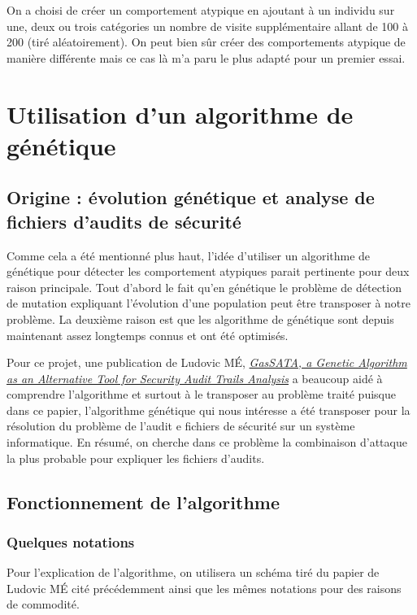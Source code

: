 \documentclass[a4paper, 11pt]{article}
\begin{document}
On a choisi de créer un comportement atypique en ajoutant à un individu sur une, deux ou trois catégories un nombre de visite supplémentaire allant de 100 à 200 (tiré aléatoirement). On peut bien sûr créer des comportements atypique de manière différente mais ce cas là m'a paru le plus adapté pour un premier essai.


\section{Utilisation d'un algorithme de génétique}
\subsection{Origine : évolution génétique et analyse de fichiers d'audits de sécurité}

Comme cela a été mentionné plus haut, l'idée d'utiliser un algorithme de génétique pour détecter les comportement atypiques parait pertinente pour deux raison principale. Tout d'abord le fait qu'en génétique le problème de détection de mutation expliquant l'évolution d'une population peut être transposer à notre problème. La deuxième raison est que les algorithme de génétique sont depuis maintenant assez longtemps connus et ont été optimisés.

Pour ce projet, une publication de Ludovic MÉ, \href{http://www.rennes.supelec.fr/ren/perso/lme/PUBLI/raid98.pdf}{\emph{GasSATA, a Genetic Algorithm as an Alternative Tool for Security Audit Trails Analysis}} a beaucoup aidé à comprendre l'algorithme et surtout à le transposer au problème traité puisque dans ce papier, l'algorithme génétique qui nous intéresse  a été transposer pour la résolution du problème de l'audit e fichiers de sécurité sur un système informatique. En résumé, on cherche dans ce problème la combinaison d'attaque la plus probable pour expliquer les fichiers d'audits.


\subsection{Fonctionnement de l'algorithme}

\subsubsection{Quelques notations}
Pour l'explication de l'algorithme, on utilisera un schéma tiré du papier de Ludovic MÉ cité précédemment ainsi que les mêmes notations pour des raisons de commodité.\\
\end{document}
